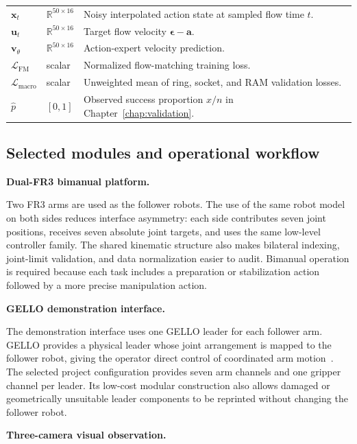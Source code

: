 \begin{table}[htbp]
\begin{tabularx}{\textwidth}{
    >{\centering\arraybackslash}p{}
    >{\raggedright\arraybackslash}p{}
    X}
    \(\mathbf x_t\) & \(\mathbb R^{50\times16}\) & Noisy interpolated action state at sampled flow time \(t\). \\
    \(\mathbf u_t\) & \(\mathbb R^{50\times16}\) & Target flow velocity \(\boldsymbol\epsilon-\mathbf a\). \\
    \(\mathbf v_\theta\) & \(\mathbb R^{50\times16}\) & Action-expert velocity prediction. \\
    \(\mathcal L_{\mathrm{FM}}\) & scalar & Normalized flow-matching training loss. \\
    \(\mathcal L_{\mathrm{macro}}\) & scalar & Unweighted mean of ring, socket, and RAM validation losses. \\
    \(\widehat p\) & \([0,1]\) & Observed success proportion \(x/n\) in Chapter~\ref{chap:validation}. \\
    \bottomrule
  \end{tabularx}
\end{table}

\subsection{Selected modules and operational workflow}

\medskip
\noindent\textbf{Dual-FR3 bimanual platform.}

Two FR3 arms are used as the follower robots. The use of the same robot model on both sides reduces interface asymmetry: each side contributes seven joint positions, receives seven absolute joint targets, and uses the same low-level controller family. The shared kinematic structure also makes bilateral indexing, joint-limit validation, and data normalization easier to audit. Bimanual operation is required because each task includes a preparation or stabilization action followed by a more precise manipulation action.

\medskip
\noindent\textbf{GELLO demonstration interface.}

The demonstration interface uses one GELLO leader for each follower arm. GELLO provides a physical leader whose joint arrangement is mapped to the follower robot, giving the operator direct control of coordinated arm motion~\cite{gello}. The selected project configuration provides seven arm channels and one gripper channel per leader. Its low-cost modular construction also allows damaged or geometrically unsuitable leader components to be reprinted without changing the follower robot.

\medskip
\noindent\textbf{Three-camera visual observation.}

